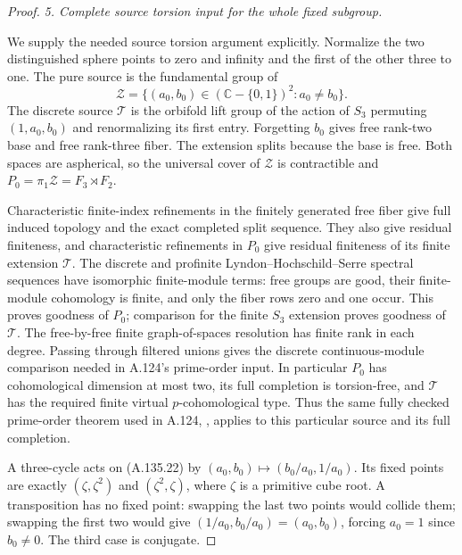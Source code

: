 \begin{proof}
\emph{5. Complete source torsion input for the whole fixed subgroup.}\par
We supply the needed source torsion argument explicitly. Normalize
the two distinguished sphere points to zero and infinity and the
first of the other three to one. The pure source is the fundamental
group of
\[
 \mathcal Z=\{(a_0,b_0)\in(\mathbb C-\{0,1\})^2:
                                      a_0\ne b_0\}.
 \tag{A.135.22}
\]
The discrete source \(\mathcal T\) is the orbifold lift group of
the action of \(S_3\) permuting \((1,a_0,b_0)\) and renormalizing
its first entry. Forgetting \(b_0\) gives free rank-two base and
free rank-three fiber. The extension splits because the base is
free. Both spaces are aspherical, so the universal cover of
\(\mathcal Z\) is contractible and
\(P_0=\pi_1\mathcal Z=F_3\rtimes F_2\).

Characteristic finite-index refinements in the finitely generated
free fiber give full induced topology and the exact completed
split sequence. They also give residual finiteness, and
characteristic refinements in \(P_0\) give residual finiteness of
its finite extension \(\mathcal T\). The discrete and profinite
Lyndon--Hochschild--Serre spectral sequences have isomorphic
finite-module terms: free groups are good, their finite-module
cohomology is finite, and only the fiber rows zero and one occur.
This proves goodness of \(P_0\); comparison for the finite
\(S_3\) extension proves goodness of \(\mathcal T\).
The free-by-free finite graph-of-spaces resolution has finite rank
in each degree. Passing through filtered unions gives the discrete
continuous-module comparison needed in A.124's prime-order input.
In particular \(P_0\) has cohomological dimension at most two,
its full completion is torsion-free, and \(\mathcal T\) has the
required finite virtual \(p\)-cohomological type.
Thus the same fully checked prime-order theorem used in A.124,
\citep[Theorem~A(i)--(iii)]{BoggiZalesskii2025}, applies to this
particular source and its full completion.

A three-cycle acts on (A.135.22) by
\((a_0,b_0)\mapsto(b_0/a_0,1/a_0)\). Its fixed points are
exactly \((\zeta,\zeta^2)\) and \((\zeta^2,\zeta)\), where
\(\zeta\) is a primitive cube root. A transposition has no fixed
point: swapping the last two points would collide them; swapping
the first two would give \((1/a_0,b_0/a_0)=(a_0,b_0)\), forcing
\(a_0=1\) since \(b_0\ne0\). The third case is conjugate.


\end{proof}
